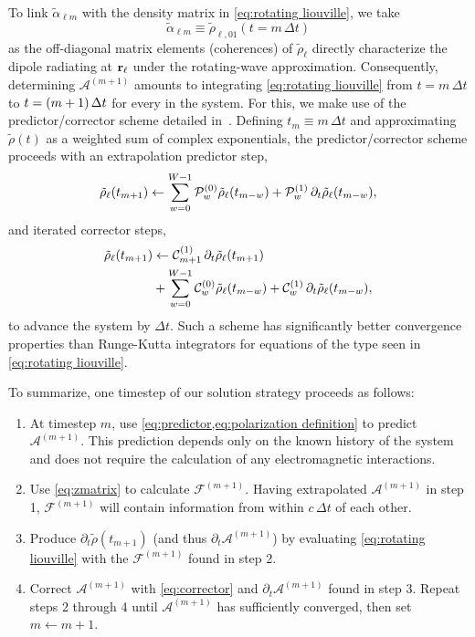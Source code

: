 To link $\tilde{\alpha}_{\ell m}$ with the density matrix in \cref{eq:rotating liouville}, we take
\begin{equation}
  \tilde{\alpha}_{\ell m} \equiv \tilde{\rho}_{\ell, 01}(t = m \, \Delta t)
  \label{eq:polarization definition}
\end{equation}
as the off-diagonal matrix elements (coherences) of $\tilde{\rho}_{\ell}$ directly characterize the dipole radiating at $\vb{r}_\ell$ under the rotating-wave approximation.
Consequently, determining $\mathcal{A}^{(m + 1)}$ amounts to integrating \cref{eq:rotating liouville} from $t = m \, \Delta t$ to $t = \qty(m + 1) \, \Delta t$ for every \qd{} in the system.
For this, we make use of the predictor/corrector scheme detailed in~\cite{Glaser2009}.
Defining $t_m \equiv m \, \Delta t$ and approximating $\tilde{\rho}(t)$ as a weighted sum of complex exponentials, the predictor/corrector scheme proceeds with an extrapolation predictor step,
\begin{equation}
  \tilde{\rho}_\ell(t_{m + 1}) \leftarrow \sum_{w = 0}^{W-1} \mathcal{P}_w^{\qty(0)} \tilde{\rho}_\ell(t_{m-w}) + \mathcal{P}_w^{\qty(1)} \, \partial_t \tilde{\rho}_\ell(t_{m-w}),
  \label{eq:predictor}
\end{equation}
and iterated corrector steps,
\begin{equation}
  \begin{aligned}
    \tilde{\rho}_\ell(t_{m + 1}) &\leftarrow \mathcal{C}_{m+1}^{\qty(1)} \, \partial_t \tilde{\rho}_\ell(t_{m+1}) \\
                                 &+ \sum_{w = 0}^{W - 1} \mathcal{C}_w^{\qty(0)} \tilde{\rho}_\ell(t_{m-w}) + \mathcal{C}_w^{\qty(1)} \, \partial_t \tilde{\rho}_\ell(t_{m-w}),
  \end{aligned}
  \label{eq:corrector}
\end{equation}
to advance the system by $\Delta t$.
Such a scheme has significantly better convergence properties than Runge-Kutta integrators for equations of the type seen in \cref{eq:rotating liouville}.

To summarize, one timestep of our solution strategy proceeds as follows:
\begin{enumerate}
  \item At timestep $m$, use \cref{eq:predictor,eq:polarization definition} to predict $\mathcal{A}^{(m + 1)}$.
    This prediction depends only on the known history of the system and does not require the calculation of any electromagnetic interactions.
  \item Use \cref{eq:zmatrix} to calculate $\mathcal{F}^{(m + 1)}$.
    Having extrapolated $\mathcal{A}^{(m + 1)}$ in step 1, $\mathcal{F}^{(m + 1)}$ will contain information from \qds{} within $c \, \Delta t$ of each other.
  \item Produce $\partial_t \tilde{\rho}(t_{m + 1})$ (and thus $\partial_t \mathcal{A}^{(m + 1)}$) by evaluating \cref{eq:rotating liouville} with the $\mathcal{F}^{(m+1)}$ found in step 2.
  \item Correct $\mathcal{A}^{(m + 1)}$ with \cref{eq:corrector} and $\partial_t \mathcal{A}^{(m + 1)}$ found in step 3.
    Repeat steps 2 through 4 until $\mathcal{A}^{(m + 1)}$ has sufficiently converged, then set $m \leftarrow m + 1$.
\end{enumerate}
